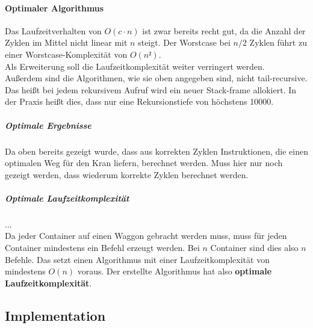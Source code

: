 \paragraph{Optimaler Algorithmus} %
Das Laufzeitverhalten von $O(c \cdot n)$ ist zwar bereits recht gut, da die Anzahl der Zyklen im Mittel nicht linear mit $n$ steigt. %
Der Worstcase bei $n/2$ Zyklen führt zu einer Worstcase-Komplexität von $O(n²)$. \\
Als Erweiterung soll die Laufzeitkomplexität weiter verringert werden. \\
Außerdem sind die Algorithmen, wie sie oben angegeben sind, nicht tail-recursive.
Das heißt bei jedem rekursivem Aufruf wird ein neuer Stack-frame allokiert.
In der Praxis heißt dies, dass nur eine Rekursionstiefe von höchstens 10000.

\subparagraph{Optimale Ergebnisse}
Da oben %
bereits gezeigt wurde, dass aus korrekten Zyklen Instruktionen, die einen optimalen Weg für den Kran liefern, berechnet werden.
Muss hier nur noch gezeigt werden, dass wiederum korrekte Zyklen berechnet werden. \\

\subparagraph{Optimale Laufzeitkomplexität}
... \\
Da jeder Container auf einen Waggon gebracht werden muss, muss für jeden Container mindestens ein Befehl erzeugt werden.
Bei $n$ Container sind dies also $n$ Befehle. Das setzt einen Algorithmus mit einer Laufzeitkomplexität von mindestens $O(n)$ voraus.
Der erstellte Algorithmus hat also \textbf{optimale Laufzeitkomplexität}.

\subsection{Implementation}
